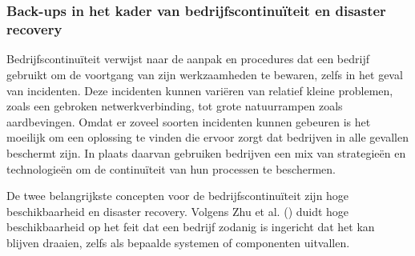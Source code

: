 \chapter{}%
\label{ch:stand-van-zaken}






\subsection{Back-ups in het kader van bedrijfscontinuïteit en disaster recovery}
Bedrijfscontinuïteit verwijst naar de aanpak en procedures dat een bedrijf gebruikt om de voortgang van zijn werkzaamheden te bewaren, zelfs in het geval van incidenten. Deze incidenten kunnen variëren van relatief kleine problemen, zoals een gebroken netwerkverbinding, tot grote natuurrampen zoals aardbevingen. Omdat er zoveel soorten incidenten kunnen gebeuren is het moeilijk om een oplossing te vinden die ervoor zorgt dat bedrijven in alle gevallen beschermt zijn. In plaats daarvan gebruiken bedrijven een mix van strategieën en technologieën om de continuïteit van hun processen te beschermen. 

De twee belangrijkste concepten voor de bedrijfscontinuïteit zijn hoge beschikbaarheid en disaster recovery. Volgens Zhu et al. (\citeyear{Zhu2015}) duidt hoge beschikbaarheid op het feit dat een bedrijf zodanig is ingericht dat het kan blijven draaien, zelfs als bepaalde systemen of componenten uitvallen.


